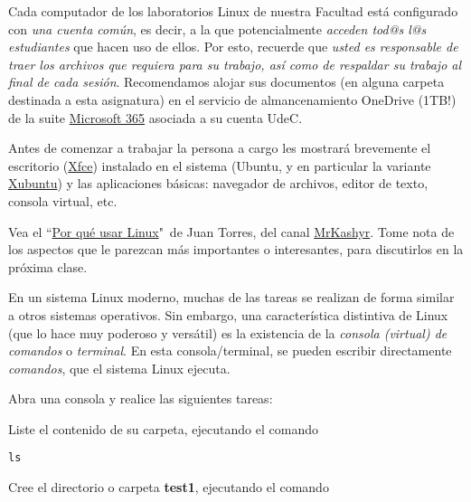 \documentclass[11pt]{exam}
\begin{document}
\begin{questions}

\item Cada computador de los laboratorios Linux de nuestra Facultad está configurado con \textit{una cuenta común}, es decir, a la que potencialmente \textit{acceden tod@s l@s estudiantes} que hacen uso de ellos. Por esto, recuerde que \textit{usted es responsable de traer los archivos que requiera para su trabajo, así como de respaldar su trabajo al final de cada sesión}. Recomendamos alojar sus documentos (en alguna carpeta destinada a esta asignatura) en el servicio de almancenamiento OneDrive (1TB!) de la suite \href{https://www.office.com/}{Microsoft 365} asociada a su cuenta UdeC.

\item Antes de comenzar a trabajar la persona a cargo les mostrar\'a brevemente
el escritorio (\href{http://www.xfce.org/?lang=es}{Xfce}) instalado en el sistema (Ubuntu, y en particular la variante \href{http://xubuntu.org/}{Xubuntu}) y las aplicaciones b\'asicas: navegador de archivos, editor de texto, consola virtual, etc.

\item Vea el ``\href{https://youtu.be/p6rSvMrOpeo}{Por qué usar Linux}"\, de Juan Torres, del canal \href{https://www.youtube.com/channel/UCk5zxKnvQkKdmLJzh-E6tKA}{MrKashyr}. Tome nota de los aspectos que le parezcan más importantes o interesantes, para discutirlos en la próxima clase.


\item En un sistema Linux moderno, muchas de las tareas se realizan de forma similar a otros sistemas operativos. Sin embargo, una característica distintiva de Linux (que lo hace muy poderoso y versátil) es la existencia de la \textit{consola (virtual) de comandos} o \textit{terminal}. En esta consola/terminal, se pueden escribir directamente \textit{comandos}, que el sistema Linux ejecuta. 

Abra una consola y realice las siguientes tareas:
\begin{parts}
\item Liste el contenido de su carpeta, ejecutando el comando 

\begin{verbatim}
ls
\end{verbatim}

\item Cree el directorio o carpeta \textbf{test1}, ejecutando el comando 


\end{parts}
\end{questions}
\end{document}
